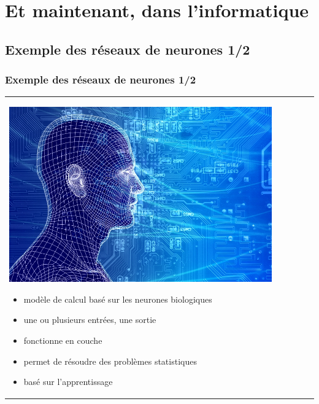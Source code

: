 \documentclass[handout]{beamer}
\begin{document}
	\section{Et maintenant, dans l'informatique}

	\subsection{Exemple des réseaux de neurones 1/2}
		\begin{frame}
		\frametitle{Exemple des réseaux de neurones 1/2}
		\begin{tabular}{l l}
			\begin{minipage}{0.4\textwidth}
				\begin{center}
					\includegraphics[width=0.9\textwidth]{images/neural_networking.jpg}
				\end{center}
			\end{minipage}

			\begin{minipage}{0.6\textwidth}
				\begin{itemize}
					\item modèle de calcul basé sur les neurones biologiques
					\item une ou plusieurs entrées, une sortie
					\item fonctionne en couche
					\item permet de résoudre des problèmes statistiques
					\item basé sur l'apprentissage
				\end{itemize}
			\end{minipage}
			
		\end{tabular}
		\end{frame}
\end{document}
